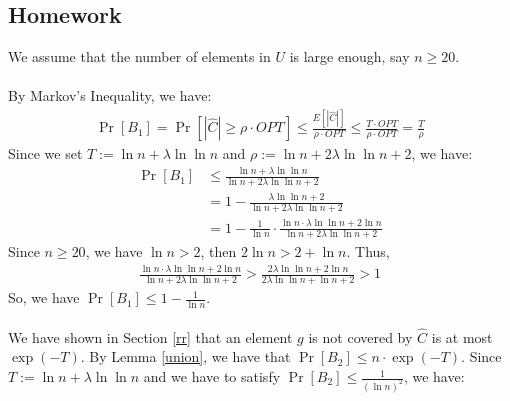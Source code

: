 \subsection{Homework}
We assume that the number of elements in $U$ is large enough, say $n \ge 20$.\\
\\
By Markov's Inequality, we have:
\begin{align}
  \nonumber \Pr[B_1]=\Pr[|\widehat{C}|\ge \rho \cdot OPT]\le \frac{E[|\widehat{C}|]}{\rho \cdot OPT}\le  \frac{T\cdot OPT}{\rho \cdot OPT} = \frac{T}{\rho}
\end{align}
Since we set $T := \ln n + \lambda \ln \ln n$ and $\rho:=\ln n+2\lambda \ln\ln n +2$, we have:
\begin{align}
  \nonumber \Pr[B_1] &\le \frac{\ln n + \lambda \ln \ln n}{\ln n+2\lambda \ln\ln n +2}\\
  \nonumber &=1-\frac{\lambda\ln\ln n+2}{\ln n + 2 \lambda \ln \ln n +2}\\
  \nonumber &=1-\frac{1}{\ln n}\cdot \frac{\ln n \cdot \lambda \ln \ln n +2\ln n}{\ln n + 2\lambda \ln\ln n +2 }
\end{align}
Since $n\ge 20$, we have $\ln n > 2$, then $2\ln n > 2+\ln n$.
Thus,
\begin{align}
  \nonumber \frac{\ln n \cdot \lambda \ln \ln n +2\ln n}{\ln n + 2\lambda \ln\ln n +2 }
  > \frac{2\lambda \ln \ln n +2\ln n}{2\lambda \ln\ln n+\ln n +2}
  > 1
\end{align}
So, we have $\Pr[B_1]\le 1-\frac{1}{\ln n}$.\\
\\
We have shown in Section \ref{rr} that an element $g$ is not covered by $\widehat{C}$ is at most $\exp({-T})$.
By Lemma \ref{union}, we have that $\Pr[B_2]\le n\cdot \exp({-T})$.
Since $T := \ln n + \lambda \ln \ln n$ and we have to satisfy  $\Pr[B_2]\le \frac{1}{(\ln n)^2}$, we have:
